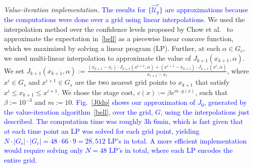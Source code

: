 \documentclass[letterpaper, 10 pt, conference]{ieeeconf}  %
\begin{document}
\textit{Value-iteration implementation.}
\textcolor{blue}{The results for $\{\widehat{\mathcal{U}}_y^r\}$ are approximations because the computations were done 
over a grid using linear interpolations.}
We used the interpolation method over the confidence levels proposed by Chow et al.~\cite{chow2015risk} 
to approximate the expectation in~\eqref{bell} as a piecewise linear concave function, which we maximized by solving a linear program (LP).
Further, at each $\alpha \in G_c$, we used multi-linear interpolation to approximate the value of $J_{k+1}(x_{k+1}, \alpha)$.
We set $J_{k+1}(x_{k+1}, \alpha) := \frac{(x_{k+1} - x_i) \cdot J_{k+1}(x^{i+1}, \alpha) + (x^{i+1} - x_{k+1})  \cdot J_{k+1}(x^i, \alpha)}{x_{i+1}-x_i}$,
where $x^i \in G_s$ and $x^{i+1} \in G_s$ are the two nearest grid points to $x_{k+1}$ that satisfy $x^i \leq x_{k+1} \leq x^{i+1}$.
We chose the stage cost, $c(x) := \beta e^{m \cdot g(x)}$, such that $\beta := 10^{-3}$ and $m := 10$.
\textcolor{blue}{Fig.~\ref{J0dp} shows our approximation of $J_0$, generated by the value-iteration algorithm~\eqref{bell}, over the grid, $G$,
using the interpolations just described.
The computation time was roughly 3h 6min, 
which is fast given that at each time point an LP was solved for each grid point, yielding $N\cdot|G_s|\cdot|G_c| = 48\cdot66\cdot9 = 28,512$ LP's in total.
A more efficient implementation would require solving only $N = 48$ LP's in total, where each LP encodes the entire grid.}
\end{document}
